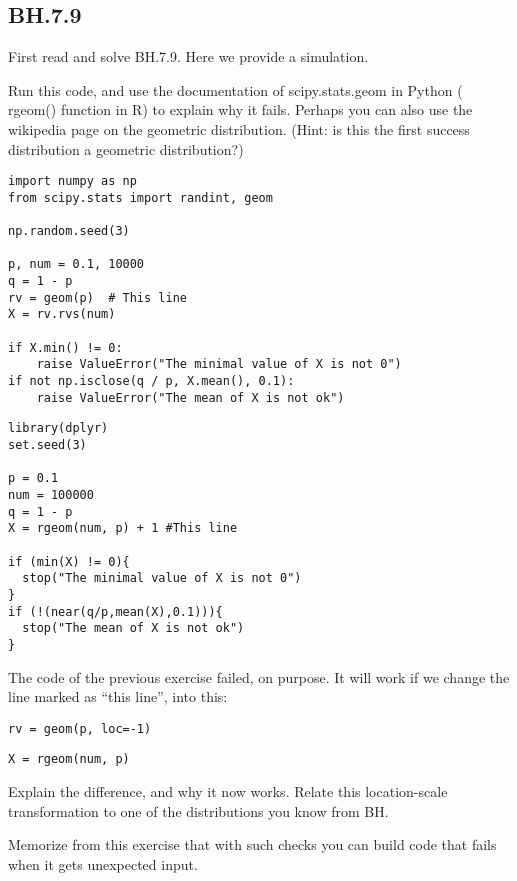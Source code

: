\subsection{BH.7.9}
\label{sec:bh.7.9}

First read and solve BH.7.9. Here we provide a simulation.

\begin{exercise}
Run this code, and use the documentation of scipy.stats.geom in Python ( rgeom() function in R) to explain why it fails. Perhaps you can also use the wikipedia page on the geometric distribution. (Hint: is this the first success distribution a geometric distribution?)
\begin{verbatim}
import numpy as np
from scipy.stats import randint, geom

np.random.seed(3)

p, num = 0.1, 10000
q = 1 - p
rv = geom(p)  # This line
X = rv.rvs(num)

if X.min() != 0:
    raise ValueError("The minimal value of X is not 0")
if not np.isclose(q / p, X.mean(), 0.1):
    raise ValueError("The mean of X is not ok")
\end{verbatim}


\begin{verbatim}
library(dplyr)
set.seed(3)

p = 0.1
num = 100000
q = 1 - p
X = rgeom(num, p) + 1 #This line 

if (min(X) != 0){
  stop("The minimal value of X is not 0")
}
if (!(near(q/p,mean(X),0.1))){
  stop("The mean of X is not ok")
}
\end{verbatim}
\end{exercise}

\begin{exercise}
The code of the previous exercise failed, on purpose.   It will work if we change the line marked as ``this line'', into this:
\begin{verbatim}
rv = geom(p, loc=-1)
\end{verbatim}

\begin{verbatim}
X = rgeom(num, p)
\end{verbatim}
Explain the difference, and why it now works. Relate this location-scale transformation to one of the distributions you know from BH.
\end{exercise}

Memorize from this exercise that with such checks you can build code that fails when it gets unexpected input.


